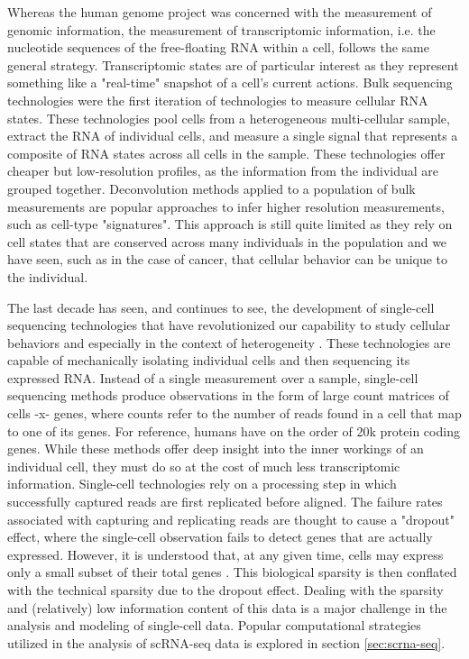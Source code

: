 Whereas the human genome project was concerned with the measurement of genomic information,
the measurement of transcriptomic information, i.e. the nucleotide sequences of the free-floating RNA within a cell, follows the same general strategy.
Transcriptomic states are of particular interest as they represent something like a "real-time" snapshot of a cell's current actions.
Bulk sequencing technologies were the first iteration of technologies to measure cellular RNA states.
These technologies pool cells from a heterogeneous multi-cellular sample,
extract the RNA of individual cells, and measure a single signal that represents a composite of RNA states across all cells in the sample.
These technologies offer cheaper but low-resolution profiles, as the information from the individual are grouped together.
Deconvolution methods applied to a population of bulk measurements are popular approaches to infer higher resolution measurements, such as cell-type "signatures".
This approach is still quite limited as they rely on cell states that are conserved across many individuals in the population and we have seen,
such as in the case of cancer, that cellular behavior can be unique to the individual.

The last decade has seen, and continues to see, the development of single-cell sequencing technologies
that have revolutionized our capability to study cellular behaviors and especially in the context of heterogeneity \cite{moty2014}.
These technologies are capable of mechanically isolating individual cells and then sequencing its expressed RNA.
Instead of a single measurement over a sample, single-cell sequencing methods produce observations in the form of large count matrices of cells -x- genes,
where counts refer to the number of reads found in a cell that map to one of its genes.
For reference, humans have on the order of 20k protein coding genes.
While these methods offer deep insight into the inner workings of an individual cell, they must do so at the cost of much less transcriptomic information.
Single-cell technologies rely on a processing step in which successfully captured reads are first replicated before aligned.
The failure rates associated with capturing and replicating reads are thought to cause a "dropout" effect, where the single-cell observation fails to detect genes that are actually expressed.
However, it is understood that, at any given time, cells may express only a small subset of their total genes \cite{adams2008}.
This biological sparsity is then conflated with the technical sparsity due to the dropout effect.
Dealing with the sparsity and (relatively) low information content of this data is a major challenge in the analysis and modeling of single-cell data.
Popular computational strategies utilized in the analysis of scRNA-seq data is explored in section \ref{sec:scrna-seq}.


